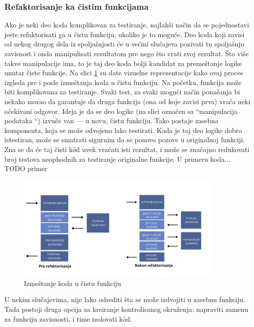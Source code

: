 \documentclass[12pt,oneside]{memoir}
\begin{document}
\subsubsection{Refaktorisanje ka čistim funkcijama} 
Ako je neki deo koda komplikovan za testiranje, najlakši način da se pojednostavi jeste refaktorisati ga u čistu funkciju, ukoliko je to moguće. Deo koda koji zavisi od nekog drugog dela iz spoljašnjosti će u većini slučajeva pozivati tu spoljašnju zavisnost i onda manipulisati rezultatom pre nego što vrati svoj rezultat. Što više takve manipulacije ima, to je taj deo koda bolji kandidat za premeštanje logike unutar čiste funkcije. Na slici \ref{fig:dep} su date vizuelne reprezentacije kako ovaj proces izgleda pre i posle izmeštanja koda u čistu funkciju. 
Na početku, funkcija može biti komplikovana za testiranje. Svaki test, za svaki mogući način ponašanja bi nekako morao da garantuje da druga funkcija (ona od koje zavisi prva) vraća neki očekivani odgovor. Ideja je da se deo logike (na slici označen sa ``manipulacija podataka ``) izvuče van --- u novu, čistu funkciju. Tako postaje zasebna komponenta, koja se može odvojeno lako testirati. Kada je taj deo logike dobro istestiran, može se smatrati sigurnim da se ponovo pozove u originalnoj funkciji. Zna se da će taj čisti k$\hat{o}$d uvek vraćati isti rezultat, i može se značajno redukovati broj testova neophodnih za testiranje originalne funkcije. U primeru koda... TODO primer

\begin{figure}[!ht]
  \centering
  \label{fig:dep}
  \includegraphics[width=0.9\textwidth]{dep.png}
  \caption{Izmeštanje koda u čistu funkciju}
\end{figure}

\par  U nekim slučajevima, nije lako odrediti šta se može izdvojiti u zasebnu funkciju. Tada postoji druga opcija za kreiranje kontrolisanog okruženja: napraviti zamenu za funkciju zavisnosti, i time izolovati k$\hat{o}$d. 
\end{document}
